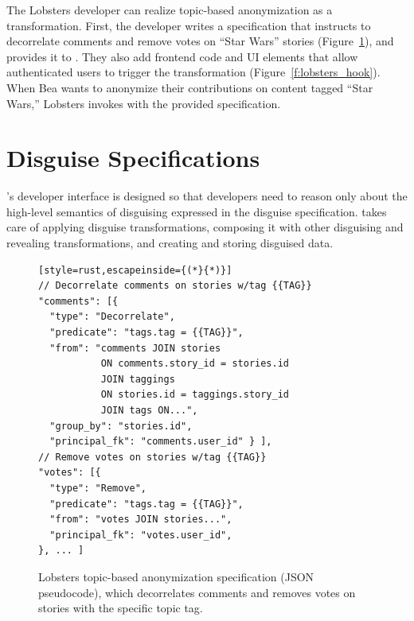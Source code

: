 %
The Lobsters developer can realize topic-based anonymization as a \xxing
transformation.
%
First, the developer writes a \xx specification that instructs \sys to
decorrelate comments and remove votes on ``Star Wars'' stories
(Figure~\ref{f:spec}), and provides it to \sys.
%
They also add frontend code and UI elements that allow authenticated users to
trigger the \xxing transformation (Figure~\ref{f:lobsters_hook}).
%
When Bea wants to anonymize their contributions on content tagged ``Star Wars,''
Lobsters invokes \sys with the provided specification.


\section{Disguise Specifications}
\label{s:spec}

\sys's developer interface is designed so that developers need to reason only
about the high-level semantics of disguising expressed in the disguise
specification. \sys takes care of applying disguise transformations, composing
it with other disguising and revealing transformations, and creating and storing
disguised data.


\begin{figure}[t]
\centering
\begin{lstlisting}[style=rust,escapeinside={(*}{*)}]
// Decorrelate comments on stories w/tag {{TAG}}
"comments": [{
  "type": "Decorrelate",
  "predicate": "tags.tag = {{TAG}}",
  "from": "comments JOIN stories
           ON comments.story_id = stories.id
           JOIN taggings
           ON stories.id = taggings.story_id
           JOIN tags ON...",
  "group_by": "stories.id",
  "principal_fk": "comments.user_id" } ],
// Remove votes on stories w/tag {{TAG}}
"votes": [{
  "type": "Remove",
  "predicate": "tags.tag = {{TAG}}",
  "from": "votes JOIN stories...",
  "principal_fk": "votes.user_id",
}, ... ]
\end{lstlisting}
    \caption{Lobsters topic-based anonymization \xx specification (JSON
    pseudocode), which decorrelates comments and removes votes on stories with
    the specific topic tag.}
\label{f:spec}
\end{figure}

